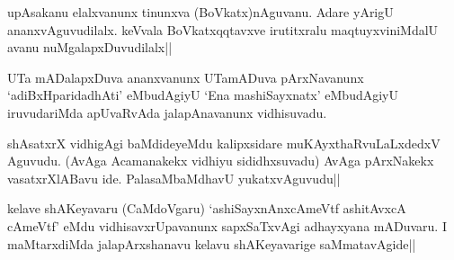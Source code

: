 
\begin{artha}
upAsakanu elalxvanunx tinunxva (BoVkatx)nAguvanu. Adare yArigU 
ananxvAguvudilalx. keVvala BoVkatxqqtavxve irutitxralu 
maqtuyxviniMdalU avanu nuMgalapxDuvudilalx||
\end{artha}


\begin{artha}
UTa mADalapxDuva ananxvanunx UTamADuva pArxNavanunx 
`adiBxHparidadhAti' eMbudAgiyU `Ena mashiSayxnatx' eMbudAgiyU 
iruvudariMda apUvaRvAda jalapAnavanunx vidhisuvadu.
\end{artha}

\begin{artha}
shAsatxrX vidhigAgi baMdideyeMdu kalipxsidare muKAyxthaRvuLaLxdedxV 
Aguvudu. (AvAga Acamanakekx vidhiyu sididhxsuvadu) AvAga pArxNakekx 
vasatxrXlABavu ide. PalasaMbaMdhavU yukatxvAguvudu||
\end{artha}

\begin{artha}
kelave shAKeyavaru (CaMdoVgaru) `ashiSayxnAnxcAmeVtf ashitAvxcA 
cAmeVtf' eMdu vidhisavxrUpavanunx sapxSaTxvAgi adhayxyana mADuvaru. I 
maMtarxdiMda jalapArxshanavu kelavu shAKeyavarige saMmatavAgide||
\end{artha}

